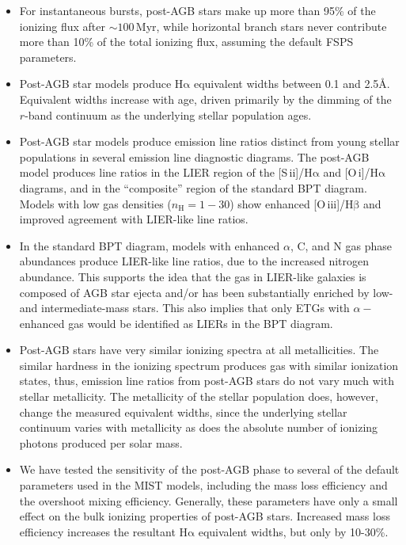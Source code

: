 \documentclass[preprint2]{aastex62}
\newcommand{\FSPS}{{\sc FSPS}\xspace}
\newcommand{\sii}{[S\,{\sc ii}]\xspace}
\newcommand{\oiii}{[O\,{\sc iii}]\xspace}
\newcommand{\oi}{[O\,{\sc i}]\xspace}
\newcommand{\ha}{\ensuremath{\mathrm{H\alpha}}\xspace}
\newcommand{\hb}{\ensuremath{\mathrm{H\beta}}\xspace}
\newcommand{\ang}{\ensuremath{\mbox{\AA}}\xspace}
\newcommand{\Myr}{$\,$Myr\xspace}
\begin{document}
\begin{itemize}
    \item For instantaneous bursts, post-AGB stars make up more than 95\% of the ionizing flux after ${\sim}100$\Myr, while horizontal branch stars never contribute more than 10\% of the total ionizing flux, assuming the default \FSPS parameters.
    \item Post-AGB star models produce \ha equivalent widths between 0.1 and 2.5\ang. Equivalent widths increase with age, driven primarily by the dimming of the $r$-band continuum as the underlying stellar population ages.
    \item Post-AGB star models produce emission line ratios distinct from young stellar populations in several emission line diagnostic diagrams. The post-AGB model produces line ratios in the LIER region of the \sii/\ha and \oi/\ha diagrams, and in the ``composite'' region of the standard BPT diagram. Models with low gas densities ($n_{\mathrm{H}} = 1-30$) show enhanced \oiii/\hb and improved agreement with LIER-like line ratios.
    \item In the standard BPT diagram, models with enhanced $\alpha$, C, and N gas phase abundances produce LIER-like line ratios, due to the increased nitrogen abundance. This supports the idea that the gas in LIER-like galaxies is composed of AGB star ejecta and/or has been substantially enriched by low- and intermediate-mass stars. This also implies that only ETGs with $\alpha-$enhanced gas would be identified as LIERs in the BPT diagram.
    \item Post-AGB stars have very similar ionizing spectra at all metallicities. The similar hardness in the ionizing spectrum produces gas with similar ionization states, thus, emission line ratios from post-AGB stars do not vary much with stellar metallicity. The metallicity of the stellar population does, however, change the measured equivalent widths, since the underlying stellar continuum varies with metallicity as does the absolute number of ionizing photons produced per solar mass.
    \item We have tested the sensitivity of the post-AGB phase to several of the default parameters used in the MIST models, including the mass loss efficiency and the overshoot mixing efficiency. Generally, these parameters have only a small effect on the bulk ionizing properties of post-AGB stars. Increased mass loss efficiency increases the resultant \ha equivalent widths, but only by 10-30\%.
\end{itemize}
\end{document}
